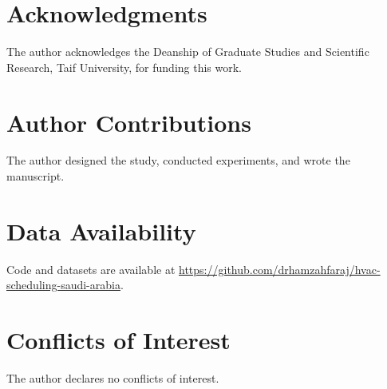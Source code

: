 \documentclass[12pt,a4paper]{article}
\let\oldsection\section
\renewcommand{\section}[1]{\FloatBarrier\oldsection{#1}}
\begin{document}
\section{Acknowledgments}
The author acknowledges the Deanship of Graduate Studies and Scientific
Research, Taif University, for funding this work.

\section{Author Contributions}
The author designed the study, conducted experiments, and wrote the
manuscript.

\section{Data Availability}
Code and datasets are available at
\url{https://github.com/drhamzahfaraj/hvac-scheduling-saudi-arabia}.

\section{Conflicts of Interest}
The author declares no conflicts of interest.



\end{document}
